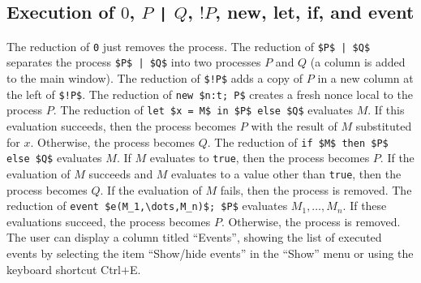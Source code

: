 \documentclass{book}
\begin{document}
\subsection{Execution of $0$, $P$  \lstinline!|!  $Q$, $!P$, new, let, if, and event}
The reduction of \lstinline!0! just removes the process. The reduction of \lstinline!$P$ | $Q$! separates the process \lstinline!$P$ | $Q$! into two processes $P$ and $Q$ (a column is added to the main window). The reduction of \lstinline:$!P$: adds a copy of $P$ in a new column at the left of  \lstinline:$!P$:. The reduction of \lstinline!new $n:t; P$! creates a fresh nonce local to the process $P$. The reduction of \lstinline!let $x = M$ in $P$ else $Q$! evaluates $M$. If this evaluation succeeds, then the process becomes $P$ with the result of $M$ substituted for $x$. Otherwise, the process becomes $Q$. The reduction of \lstinline!if $M$ then $P$ else $Q$! evaluates $M$. If $M$ evaluates to \lstinline!true!, then the process becomes $P$. If the evaluation of $M$ succeeds and $M$ evaluates to a value other than \lstinline!true!, then the process becomes $Q$. If the evaluation of $M$ fails, then the process is removed. The reduction of \lstinline!event $e(M_1,\dots,M_n)$; $P$! evaluates $M_1, \dots, M_n$. If these evaluations succeed, the process becomes $P$. Otherwise, the process is removed. The user can display a column titled ``Events'', showing the list of executed events by selecting the item ``Show/hide events'' in the ``Show'' menu or using the keyboard shortcut Ctrl$+$E.
\end{document}
